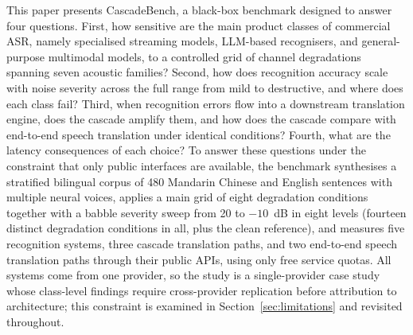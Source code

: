 This paper presents CascadeBench, a black-box benchmark designed to answer
four questions. First, how sensitive are the main product classes of
commercial ASR, namely specialised streaming models, LLM-based recognisers,
and general-purpose multimodal models, to a controlled grid of channel
degradations spanning seven acoustic families? Second, how does recognition
accuracy scale with noise
severity across the full range from mild to destructive, and where does
each class fail? Third, when
recognition errors flow into a downstream translation engine, does the
cascade amplify them, and how does the cascade compare with end-to-end speech
translation under identical conditions? Fourth, what are the latency
consequences of each choice? To answer these questions under the
constraint that only public interfaces are available, the benchmark
synthesises a stratified bilingual corpus of 480 Mandarin Chinese and English
sentences with multiple neural voices, applies a main grid of eight
degradation conditions together with a babble severity sweep from 20 to
$-10$~dB in eight levels (fourteen distinct degradation conditions in all,
plus the clean reference), and measures five recognition systems, three
cascade
translation paths, and two
end-to-end speech translation paths through their public APIs, using only
free service quotas. All systems come from one provider, so the study is a
single-provider case study whose class-level findings require cross-provider
replication before attribution to architecture; this constraint is examined
in Section~\ref{sec:limitations} and revisited throughout.

